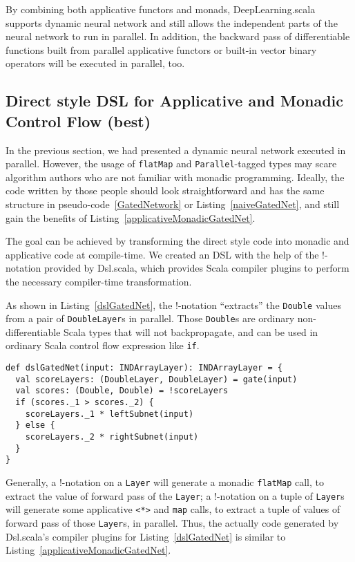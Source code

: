 By combining both applicative functors and monads, DeepLearning.scala supports dynamic neural network and still allows the independent parts of the neural network to run in parallel. In addition, the backward pass of differentiable functions built from parallel applicative functors or built-in vector binary operators will be executed in parallel, too.

\subsection{Direct style DSL for Applicative and Monadic Control Flow (best)}

In the previous section, we had presented a dynamic neural network executed in parallel. However, the usage of \lstinline{flatMap} and \lstinline{Parallel}-tagged types may scare algorithm authors who are not familiar with monadic programming. Ideally, the code written by those people should look straightforward and has the same structure in pseudo-code~\ref{GatedNetwork} or Listing~\ref{naiveGatedNet}, and still gain the benefits of Listing~\ref{applicativeMonadicGatedNet}.

The goal can be achieved by transforming the direct style code into monadic and applicative code at compile-time. We created an DSL with the help of the !-notation provided by Dsl.scala\cite{yang2017dsl}, which provides Scala compiler plugins to perform the necessary compiler-time transformation.

As shown in Listing~\ref{dslGatedNet}, the !-notation ``extracts'' the \lstinline{Double} values from a pair of \lstinline{DoubleLayer}s in parallel. Those \lstinline{Double}s are ordinary non-differentiable Scala types that will not backpropagate, and can be used in ordinary Scala control flow expression like \lstinline{if}.

\begin{lstlisting}[float={h t b p},caption={Dsl.scala powered direct style gated network}, label={dslGatedNet}]
def dslGatedNet(input: INDArrayLayer): INDArrayLayer = {
  val scoreLayers: (DoubleLayer, DoubleLayer) = gate(input)
  val scores: (Double, Double) = !scoreLayers
  if (scores._1 > scores._2) {
    scoreLayers._1 * leftSubnet(input)
  } else {
    scoreLayers._2 * rightSubnet(input)
  }
}
\end{lstlisting}

Generally, a !-notation on a \lstinline{Layer} will generate a monadic \lstinline{flatMap} call, to extract the value of forward pass of the \lstinline{Layer}; a !-notation on a tuple of \lstinline{Layer}s will generate some applicative \lstinline{<*>} and \lstinline{map} calls, to extract a tuple of values of forward pass of those \lstinline{Layer}s, in parallel. Thus, the actually code generated by Dsl.scala's compiler plugins for Listing~\ref{dslGatedNet} is similar to Listing~\ref{applicativeMonadicGatedNet}.

